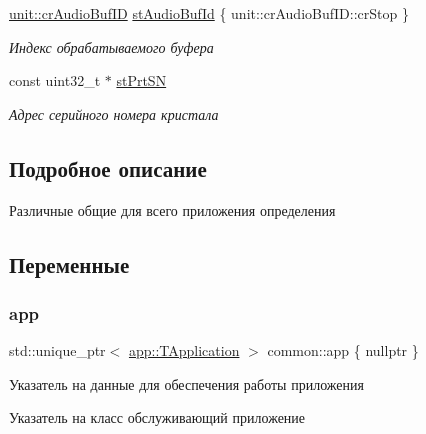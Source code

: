 \begin{DoxyCompactItemize}
\mbox{\label{namespacecommon_a1a1c25124d2328c41042070beb16c208}} 
\hyperlink{group___xD0_x9F_xD0_xB5_xD1_x80_xD0_xB5_xD1_x87_xD0_xB8_xD1_x81_xD0_xBB_xD0_xB5_xD0_xBD_xD0_xB8_xD1_x8F_ga30dd689bff585403e080598b50585936}{unit\+::cr\+Audio\+Buf\+ID} \hyperlink{namespacecommon_a1a1c25124d2328c41042070beb16c208}{st\+Audio\+Buf\+Id} \{ unit\+::cr\+Audio\+Buf\+I\+D\+::cr\+Stop \}
\begin{DoxyCompactList}\small\item\em Индекс обрабатываемого буфера \end{DoxyCompactList}\item 
\mbox{\label{namespacecommon_a516c5010126a38173eacd0de486b662e}} 
const uint32\+\_\+t $\ast$ \hyperlink{namespacecommon_a516c5010126a38173eacd0de486b662e}{st\+Prt\+SN}
\begin{DoxyCompactList}\small\item\em Адрес серийного номера кристала \end{DoxyCompactList}\end{DoxyCompactItemize}


\subsection{Подробное описание}
Различные общие для всего приложения определения 

\subsection{Переменные}
\mbox{\label{namespacecommon_afb09e0e369090296753bc8e2d0274823}} 
\subsubsection{\texorpdfstring{app}{app}}
{\footnotesize\ttfamily std\+::unique\+\_\+ptr$<$ \hyperlink{classapp_1_1_t_application}{app\+::\+T\+Application} $>$ common\+::app \{ nullptr \}}



Указатель на данные для обеспечения работы приложения 

Указатель на класс обслуживающий приложение 